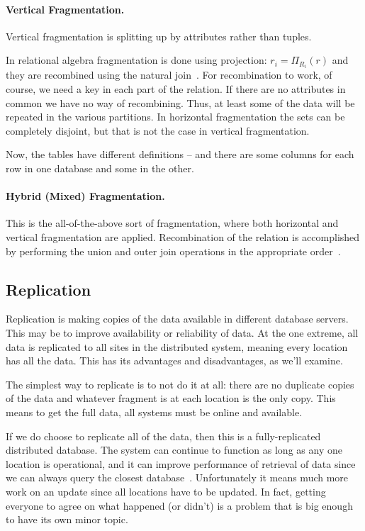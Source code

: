 \paragraph{Vertical Fragmentation.} Vertical fragmentation is splitting up by attributes rather than tuples. 

In relational algebra fragmentation is done using projection: $r_{i} = \Pi_{R_{i}}
(r)$ and they are recombined using the natural join~\cite{dsc}.  For recombination to work, of course, we need a key in each part of the relation. If there are no attributes in common we have no way of recombining. Thus, at least some of the data will be repeated in the various partitions. In horizontal fragmentation the sets can be completely disjoint, but that is not the case in vertical fragmentation. 

Now, the tables have different definitions -- and there are some columns for each row in one database and some in the other. 


\paragraph{Hybrid (Mixed) Fragmentation.} This is the all-of-the-above sort of fragmentation, where both horizontal and vertical fragmentation are applied. Recombination of the relation is accomplished by performing the union and outer join operations in the appropriate order~\cite{fds}. 

\subsection*{Replication}

Replication is making copies of the data available in different database servers. This may be to improve availability or reliability of data. At the one extreme, all data is replicated to all sites in the distributed system, meaning every location has all the data. This has its advantages and disadvantages, as we'll examine. 

The simplest way to replicate is to not do it at all: there are no duplicate copies of the data and whatever fragment is at each location is the only copy. This means to get the full data, all systems must be online and available. 

If we do choose to replicate all of the data, then this is a fully-replicated distributed database. The system can continue to function as long as any one location is operational, and it can improve performance of retrieval of data since we can always query the closest database~\cite{fds}. Unfortunately it means much more work on an update since all locations have to be updated. In fact, getting everyone to agree on what happened (or didn't) is a problem that is big enough to have its own minor topic. 


